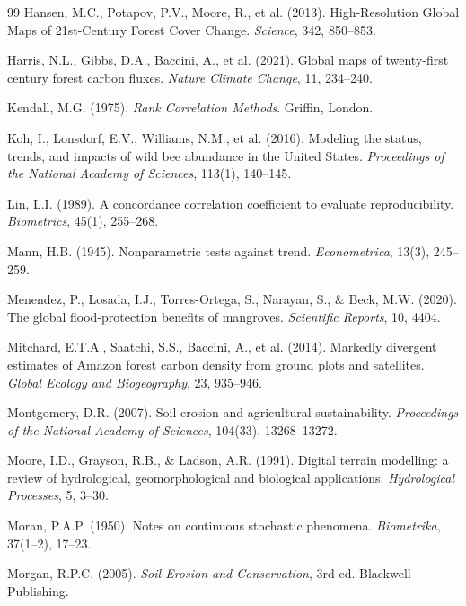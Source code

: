 \documentclass[12pt,a4paper]{article}
\begin{document}
\begin{thebibliography}{99}
Hansen, M.C., Potapov, P.V., Moore, R., et al. (2013).
High-Resolution Global Maps of 21st-Century Forest Cover Change.
\textit{Science}, 342, 850--853.

Harris, N.L., Gibbs, D.A., Baccini, A., et al. (2021).
Global maps of twenty-first century forest carbon fluxes.
\textit{Nature Climate Change}, 11, 234--240.

Kendall, M.G. (1975).
\textit{Rank Correlation Methods}. Griffin, London.

Koh, I., Lonsdorf, E.V., Williams, N.M., et al. (2016).
Modeling the status, trends, and impacts of wild bee abundance in the
United States.
\textit{Proceedings of the National Academy of Sciences}, 113(1),
140--145.

Lin, L.I. (1989).
A concordance correlation coefficient to evaluate reproducibility.
\textit{Biometrics}, 45(1), 255--268.

Mann, H.B. (1945).
Nonparametric tests against trend.
\textit{Econometrica}, 13(3), 245--259.

Menendez, P., Losada, I.J., Torres-Ortega, S., Narayan, S., \&
Beck, M.W. (2020).
The global flood-protection benefits of mangroves.
\textit{Scientific Reports}, 10, 4404.

Mitchard, E.T.A., Saatchi, S.S., Baccini, A., et al. (2014).
Markedly divergent estimates of Amazon forest carbon density from
ground plots and satellites.
\textit{Global Ecology and Biogeography}, 23, 935--946.

Montgomery, D.R. (2007).
Soil erosion and agricultural sustainability.
\textit{Proceedings of the National Academy of Sciences}, 104(33),
13268--13272.

Moore, I.D., Grayson, R.B., \& Ladson, A.R. (1991).
Digital terrain modelling: a review of hydrological, geomorphological
and biological applications.
\textit{Hydrological Processes}, 5, 3--30.

Moran, P.A.P. (1950).
Notes on continuous stochastic phenomena.
\textit{Biometrika}, 37(1--2), 17--23.

Morgan, R.P.C. (2005).
\textit{Soil Erosion and Conservation}, 3rd ed.
Blackwell Publishing.


\end{thebibliography}
\end{document}
